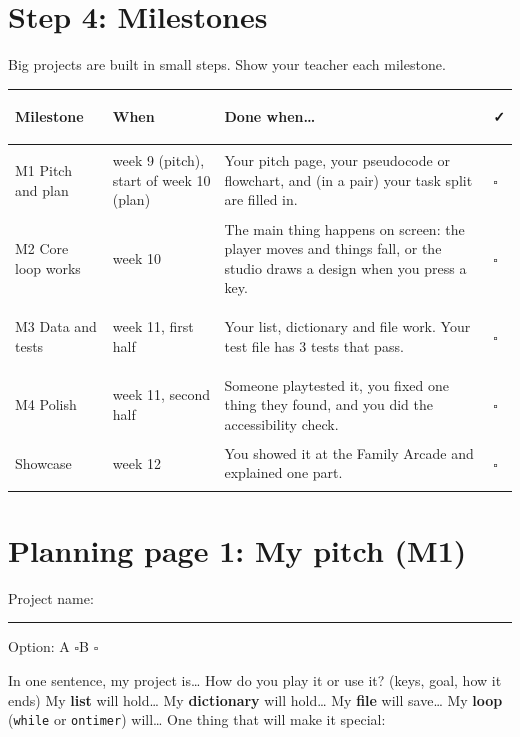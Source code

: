\documentclass[level=2]{kidscode}
\newcommand{\bx}{$\square$}
\begin{document}
\section{Step 4: Milestones}
Big projects are built in small steps. Show your teacher each milestone.

{\renewcommand{\arraystretch}{1.35}
\begin{longtable}{@{}>{\bfseries\raggedright\arraybackslash}p{3.0cm}>{\raggedright\arraybackslash}p{2.6cm}>{\raggedright\arraybackslash}p{8.0cm}>{\centering\arraybackslash}p{0.8cm}@{}}
\toprule
Milestone & When & Done when\ldots & \faCheck \\ \midrule\endhead
M1 Pitch and plan & week 9 (pitch), start of week 10 (plan) & Your pitch page, your pseudocode or flowchart, and (in a pair) your task split are filled in. & \bx \\ \midrule
M2 Core loop works & week 10 & The main thing happens on screen: the player moves and things fall, or the studio draws a design when you press a key. & \bx \\ \midrule
M3 Data and tests & week 11, first half & Your list, dictionary and file work. Your test file has 3 tests that pass. & \bx \\ \midrule
M4 Polish & week 11, second half & Someone playtested it, you fixed one thing they found, and you did the accessibility check. & \bx \\ \midrule
Showcase & week 12 & You showed it at the Family Arcade and explained one part. & \bx \\
\bottomrule
\end{longtable}}

\clearpage
\section{Planning page 1: My pitch (M1)}
\namedateline
Project name: \rule{9cm}{0.4pt}\qquad Option: A \bx\quad B \bx

\noindent In one sentence, my project is\ldots
{}
\noindent How do you play it or use it? (keys, goal, how it ends)
\noindent My \textbf{list} will hold\ldots {}
\noindent My \textbf{dictionary} will hold\ldots {}
\noindent My \textbf{file} will save\ldots {}
\noindent My \textbf{loop} (\texttt{while} or \texttt{ontimer}) will\ldots {}
\noindent One thing that will make it special:
\end{document}
